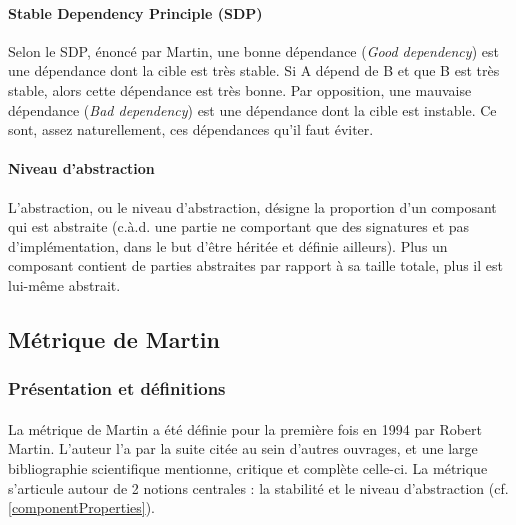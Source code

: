\documentclass{scrartcl}
\begin{document}
    \paragraph{Stable Dependency Principle (SDP)}Selon le SDP, énoncé par Martin\cite{Martin:2003}, une bonne dépendance (\emph{Good dependency}) est une dépendance dont la cible est très stable. Si A dépend de B et que B est très stable, alors cette dépendance est très bonne. Par opposition, une mauvaise dépendance (\emph{Bad dependency}) est une dépendance dont la cible est instable. Ce sont, assez naturellement, ces dépendances qu'il faut éviter.
   
    \paragraph{Niveau d'abstraction}L'abstraction, ou le niveau d'abstraction, désigne la proportion d'un composant qui est abstraite (c.à.d. une partie ne comportant que des signatures et pas d'implémentation, dans le but d'être héritée et définie ailleurs). Plus un composant contient de parties abstraites par rapport à sa taille totale, plus il est lui-même abstrait.

\subsection{Métrique de Martin}
\subsubsection{Présentation et définitions}

    \paragraph{}La métrique de Martin a été définie pour la première fois en 1994 par Robert Martin\cite{Martin:1994}. L'auteur l'a par la suite citée au sein d'autres ouvrages\cite{Martin:2003}, et une large bibliographie scientifique mentionne, critique et complète celle-ci\cite{HyryLepp:2009}\cite{BUmetric:2016}\cite{KaurShar:2015}\cite{Spinellis:2006}\cite{Pressman:2000}. La métrique s'articule autour de 2 notions centrales : la stabilité et le niveau d'abstraction (cf. \ref{componentProperties}).
\end{document}
